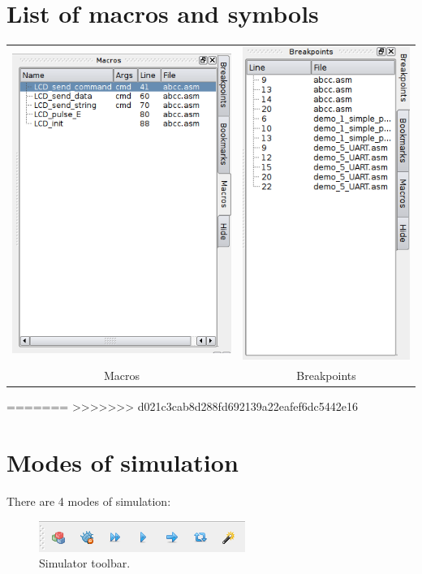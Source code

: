 \section{List of macros and symbols}
    \begin{table}[h!]
        \begin{tabular}{cc}
            \includegraphics[width=.33\textwidth]{img/macro_panel.png}
                &
            \includegraphics[width=.33\textwidth]{img/right_panel.png}
                \\
            Macros & Breakpoints
        \end{tabular}
    \end{table}

    
=======
>>>>>>> d021c3cab8d288fd692139a22eafef6dc5442e16
\section{Modes of simulation}
    There are 4 modes of simulation:

    \begin{figure}[h!]
        \centering{}
        \includegraphics[width=.4\textwidth]{img/simulation_panel.png}
        \caption{Simulator toolbar.}
    \end{figure}
    
